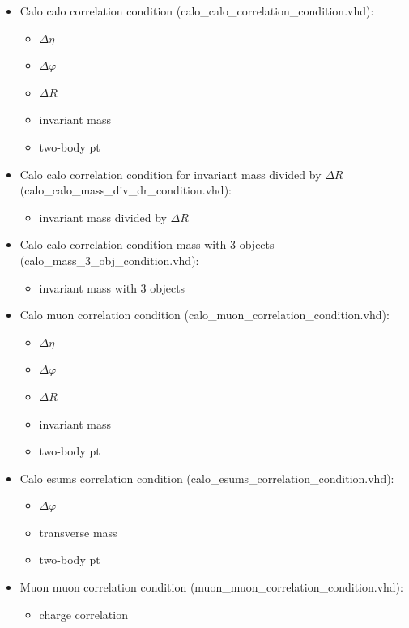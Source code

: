 \begin{itemize}
\item Calo calo correlation condition (calo\_calo\_correlation\_condition.vhd):
\begin{itemize}
\item $\Delta\eta$
\item $\Delta\varphi$
\item $\Delta$$R$
\item invariant mass
\item two-body pt
\end{itemize}
\item Calo calo correlation condition for invariant mass divided by $\Delta$$R$ (calo\_calo\_mass\_div\_dr\_condition.vhd):
\begin{itemize}
\item invariant mass divided by $\Delta$$R$
\end{itemize}
\item Calo calo correlation condition mass with 3 objects (calo\_mass\_3\_obj\_condition.vhd):
\begin{itemize}
\item invariant mass with 3 objects
\end{itemize} 
\item Calo muon correlation condition (calo\_muon\_correlation\_condition.vhd):
\begin{itemize}
\item $\Delta\eta$
\item $\Delta\varphi$
\item $\Delta$$R$
\item invariant mass
\item two-body pt
\end{itemize} 
\item Calo esums correlation condition (calo\_esums\_correlation\_condition.vhd):
\begin{itemize}
\item $\Delta\varphi$
\item transverse mass
\item two-body pt
\end{itemize}
\item Muon muon correlation condition (muon\_muon\_correlation\_condition.vhd):
\begin{itemize}
\item charge correlation

\end{itemize}$$
\end{itemize}
